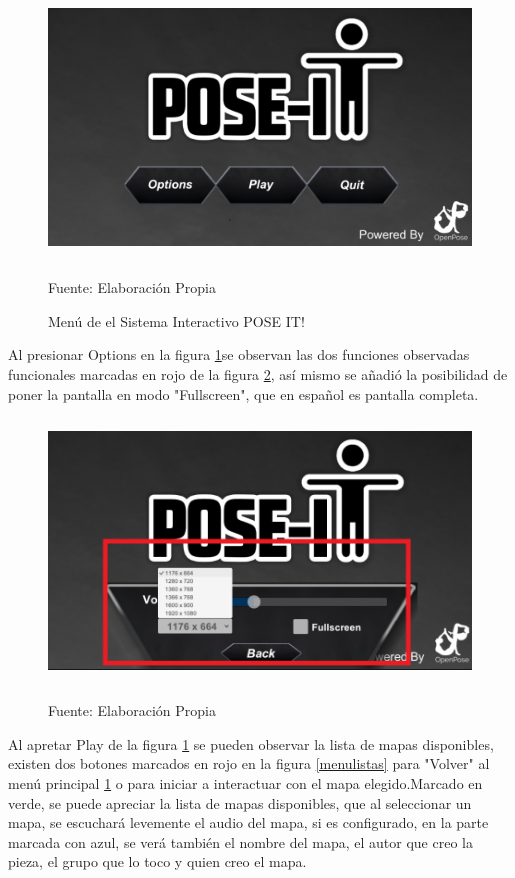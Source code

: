 \begin{figure}[t!]
	\centering
	\includegraphics[width=12cm,height=7cm]{./Images/menu.png}
	\caption{Menú de el Sistema Interactivo POSE IT!}
	\footnotesize Fuente: Elaboración Propia
	\label{menu}
\end{figure}

Al presionar Options en la figura \ref{menu}se observan las dos funciones observadas funcionales marcadas en rojo de la figura \ref{menuoptions}, así mismo se añadió la posibilidad de poner la pantalla en modo "Fullscreen", que en español es pantalla completa.

\begin{figure}[t!]
	\centering
	\includegraphics[width=12cm,height=7cm]{./Images/menuopciones.png}
	\caption{}
	\footnotesize Fuente: Elaboración Propia
	\label{menuoptions}
\end{figure}

Al apretar Play de la figura \ref{menu} se pueden observar la lista de mapas disponibles, existen dos botones marcados en rojo en la figura \ref{menulistas} para "Volver" al menú principal \ref{menu} o para iniciar a interactuar con el mapa elegido.Marcado en verde, se puede apreciar la lista de mapas disponibles, que al seleccionar un mapa, se escuchará levemente el audio del mapa, si es configurado, en la parte marcada con azul, se verá también el nombre del mapa, el autor que creo la pieza, el grupo que lo toco y quien creo el mapa.

